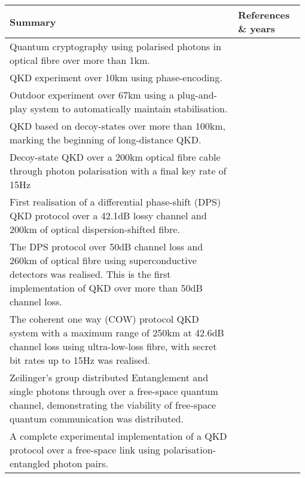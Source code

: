 \begin{table*}[!htbp]
\begin{tabular}{|p{0.755\linewidth}|p{0.22\linewidth}|}
	\hline
	Summary & References \& years \\
	\hline \hline
	Quantum cryptography using polarised photons in optical fibre over more than 1km. & \cite{bib:EL_23_383} \\
	\hline
	QKD experiment over 10km using phase-encoding. & \cite{bib:EL_29_634} \\
	\hline
	Outdoor experiment over 67km using a plug-and-play system to automatically maintain stabilisation. & \cite{bib:Arx0203118} \\
	\hline
	QKD based on decoy-states over more than 100km, marking the beginning of long-distance QKD. & \cite{bib:PRL_98_010505, bib:PRL_98_010504, bib:rosenberg2007long} \\
	\hline
	Decoy-state QKD over a 200km optical fibre cable through photon polarisation with a final key rate of 15Hz & \cite{bib:OptExp_18_8587} \\
	\hline
	First realisation of a differential phase-shift (DPS) QKD protocol over a 42.1dB lossy channel and 200km of optical dispersion-shifted fibre. & \cite{bib:NP_1_343} \\
	\hline
	The DPS protocol over 50dB channel loss and 260km of optical fibre using superconductive detectors was realised. This is the first implementation of QKD over more than 50dB channel loss.&\cite{bib:OL_37_1008}\\
	\hline
	The coherent one way (COW) protocol QKD system with a maximum range of 250km at 42.6dB channel loss using ultra-low-loss fibre, with secret bit rates up to 15Hz was realised.&\cite{bib:NJP_11_075003}\\
	\hline
	Zeilinger's group distributed Entanglement and single photons through over a free-space quantum channel, demonstrating the viability of free-space quantum communication was distributed.& \cite{bib:OE_13_202}\\
	\hline
	A complete experimental implementation of a QKD protocol over a free-space link using polarisation-entangled photon pairs.&\cite{bib:APL_89_101122}\\

\end{tabular}
\end{table*}
